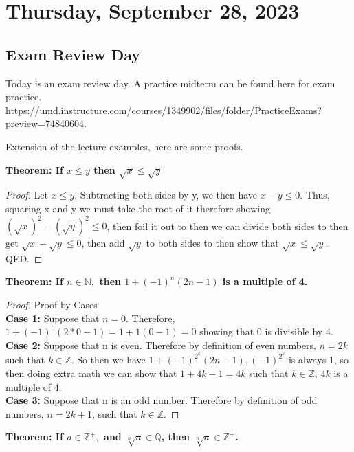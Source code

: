 \section{Thursday, September 28, 2023}
\subsection{Exam Review Day}
Today is an exam review day. A practice midterm can be found here for exam practice. \\

https://umd.instructure.com/courses/1349902/files/folder/PracticeExams?preview=74840604.

Extension of the lecture examples, here are some proofs.

\begin{example}
    \textbf{Theorem: If $x \leq y$ then $\sqrt{x} \leq \sqrt{y}$}
\end{example}

\begin{proof}
    Let $x \leq y$. Subtracting both sides by y, we then have $x-y \leq 0$. Thus, squaring x and y we must take the root of it therefore showing $(\sqrt{x})^2-(\sqrt{y})^2 \leq 0$,  then foil it out to then we can divide both sides to then get $\sqrt{x}-\sqrt{y} \leq 0$, then add $\sqrt{y}$ to both sides to then show that $\sqrt{x} \leq \sqrt{y}$. QED.
\end{proof}

\begin{example}
\textbf{Theorem: If $n \in \mathbb{N},$ then $1+(-1)^n(2n-1)$ is a multiple of 4.}
\end{example}

\begin{proof}
Proof by Cases\\
\textbf{Case 1:} Suppose that $n=0$. Therefore, $1+(-1)^0(2*0-1)=1+1(0-1)=0$ showing that 0 is divisible by 4.\\
\textbf{Case 2:} Suppose that n is even. Therefore by definition of even numbers, $n=2k$ such that $k\in \mathbb{Z}$. So then we have $1+(-1)^2^k(2n-1), (-1)^2^k$ is always 1, so then doing extra math we can show that $1+4k-1=4k$ such that $k \in \mathbb{Z}$, $4k$ is a multiple of 4.\\
\textbf{Case 3:} Suppose that n is an odd number. Therefore by definition of odd numbers, $n=2k+1$, such that $k \in \mathbb{Z}$.
\end{proof}

\begin{example}
\textbf{Theorem: If $a \in \mathbb{Z}^+,$ and $\sqrt[n]{a} \in \mathbb{Q}$, then $\sqrt[n]{a} \in \mathbb{Z}^+$.}
\end{example}

